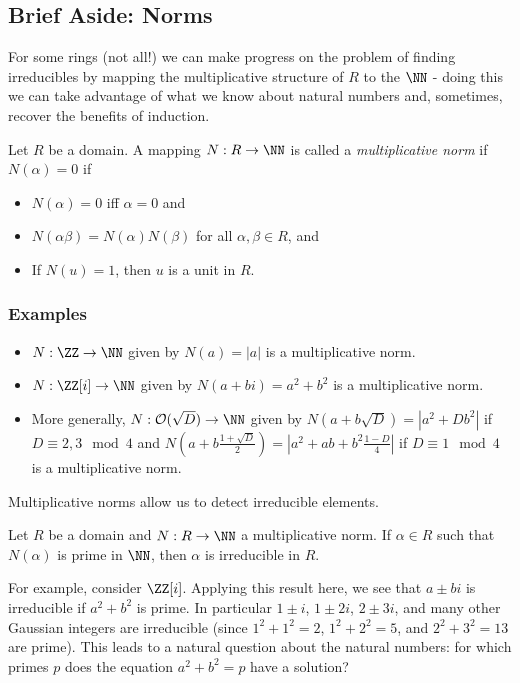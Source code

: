 \documentclass{article}
\begin{document}
\subsection*{Brief Aside: Norms}

For some rings (not all!) we can make progress on the problem of finding irreducibles by mapping the multiplicative structure of $R$ to the $\NN$ - doing this we can take advantage of what we know about natural numbers and, sometimes, recover the benefits of induction.

\begin{dfn}
Let $R$ be a domain. A mapping $N : R \rightarrow \NN$ is called a \emph{multiplicative norm} if $N(\alpha) = 0$ if
\begin{itemize}
\item $N(\alpha) = 0$ iff $\alpha = 0$ and
\item $N(\alpha\beta) = N(\alpha)N(\beta)$ for all $\alpha, \beta \in R$, and
\item If $N(u) = 1$, then $u$ is a unit in $R$.
\end{itemize}
\end{dfn}

\subsubsection*{Examples}

\begin{itemize}
\item $N : \ZZ \rightarrow \NN$ given by $N(a) = |a|$ is a multiplicative norm.
\item $N : \ZZ[i] \rightarrow \NN$ given by $N(a+bi) = a^2 + b^2$ is a multiplicative norm.
\item More generally, $N : \mathcal{O}(\sqrt{D}) \rightarrow \NN$ given by $N(a+b\sqrt{D}) = |a^2 + Db^2|$ if $D \equiv 2,3 \mod 4$ and $N(a+b\frac{1+\sqrt{D}}{2}) = |a^2 + ab + b^2\frac{1-D}{4}|$ if $D \equiv 1 \mod 4$ is a multiplicative norm.
\end{itemize}

Multiplicative norms allow us to detect irreducible elements.

\begin{prop}
Let $R$ be a domain and $N : R \rightarrow \NN$ a multiplicative norm. If $\alpha \in R$ such that $N(\alpha)$ is prime in $\NN$, then $\alpha$ is irreducible in $R$.
\end{prop}

For example, consider $\ZZ[i]$. Applying this result here, we see that $a \pm bi$ is irreducible if $a^2 + b^2$ is prime. In particular $1 \pm i$, $1 \pm 2i$, $2 \pm 3i$, and many other Gaussian integers are irreducible (since $1^2 + 1^2 = 2$, $1^2 + 2^2 = 5$, and $2^2 + 3^2 = 13$ are prime). This leads to a natural question about the natural numbers: for which primes $p$ does the equation $a^2 + b^2 = p$ have a solution?
\end{document}
